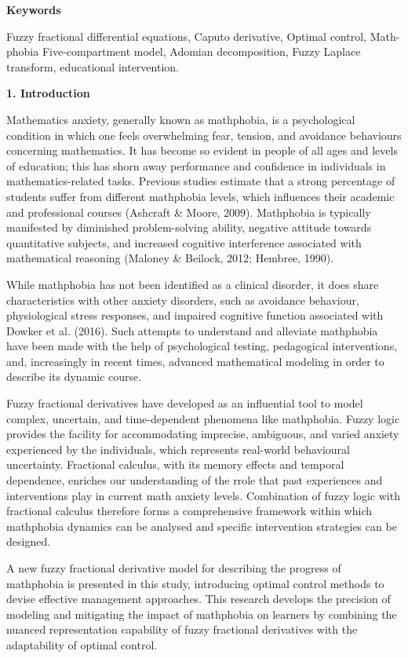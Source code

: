 \documentclass[
]{article}
\begin{document}
\textbf{Keywords}

Fuzzy fractional differential equations, Caputo derivative, Optimal control, Math-phobia Five-compartment model, Adomian decomposition, Fuzzy Laplace transform, educational intervention.

\textbf{1. Introduction}

Mathematics anxiety, generally known as mathphobia, is a psychological condition in which one feels overwhelming fear, tension, and avoidance behaviours concerning mathematics. It has become so evident in people of all ages and levels of education; this has shorn away performance and confidence in individuals in mathematics-related tasks. Previous studies estimate that a strong percentage of students suffer from different mathphobia levels, which influences their academic and professional courses (Ashcraft \& Moore, 2009). Mathphobia is typically manifested by diminished problem-solving ability, negative attitude towards quantitative subjects, and increased cognitive interference associated with mathematical reasoning (Maloney \& Beilock, 2012; Hembree, 1990).

While mathphobia has not been identified as a clinical disorder, it does share characteristics with other anxiety disorders, such as avoidance behaviour, physiological stress responses, and impaired cognitive function associated with Dowker et al. (2016). Such attempts to understand and alleviate mathphobia have been made with the help of psychological testing, pedagogical interventions, and, increasingly in recent times, advanced mathematical modeling in order to describe its dynamic course.

Fuzzy fractional derivatives have developed as an influential tool to model complex, uncertain, and time-dependent phenomena like mathphobia. Fuzzy logic provides the facility for accommodating imprecise, ambiguous, and varied anxiety experienced by the individuals, which represents real-world behavioural uncertainty. Fractional calculus, with its memory effects and temporal dependence, enriches our understanding of the rrole that past experiences and interventions play in current math anxiety levels. Combination of fuzzy logic with fractional calculus therefore forms a comprehensive framework within which mathphobia dynamics can be analysed and specific intervention strategies can be designed.

A new fuzzy fractional derivative model for describing the progress of mathphobia is presented in this study, introducing optimal control methods to devise effective management approaches. This research develops the precision of modeling and mitigating the impact of mathphobia on learners by combining the nuanced representation capability of fuzzy fractional derivatives with the adaptability of optimal control.
\end{document}
